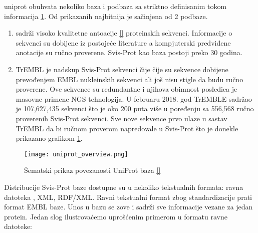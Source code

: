 uniprot obuhvata nekoliko baza i podbaza sa striktno definisanim tokom
informacija \ref{fig:uniprot_overview}. Od prikazanih najbitnija je
  sačinjena od 2 podbaze.


\begin{enumerate}
  \item {}  sadrži visoko kvalitetne antoacije
    \ref{} proteinskih sekvenci. Informacije o sekvenci su
    dobijene iz postojeće literature a kompjuterski predviđene anotacije su
    ručno proverene. Svis-Prot kao baza postoji preko 30 godina.

  \item TrEMBL  je nadskup Svis-Prot sekvenci čije čije su
    sekvence dobijene prevođenjem EMBL nukleinskih sekvenci ali još nisu stigle
    da budu ručno  proverene. Ove sekvence su redundantne i njihova obimnost
    posledica je masovne primene NGS tehnologija. U februaru 2018. god TrEMBLE
    sadržao je 107,627,435 sekvenci što je oko 200 puta više u poređenju sa
    556,568 ručno proverenih Svis-Prot sekvenci. Sve nove sekvence prvo ulaze u
    sastav TrEMBL da bi ručnom proverom napredovale u Svis-Prot što je donekle
    prikazano grafikom \ref{fig:uniprot_overview}.
\end{enumerate}


\begin{figure}[h!]
  \centering
  \texttt{[image: uniprot\_overview.png]}
  \caption{Šematski prikaz povezanosti UniProt baza \ref{}}
  \label{fig:uniprot_overview}
\end{figure}

%


Distribucije Svis-Prot baze dostupne su u nekoliko tekstualnih formata: ravna
datoteka , XML, RDF/XML.  Ravni tekstualni format zbog
standardizacije prati format EMBL baze.  Unos u bazu se zove 
 i sadrži sve informacije vezane za jedan protein. Jedan slog
ilustrovaćemo uprošćenim primerom u formatu ravne datoteke:

